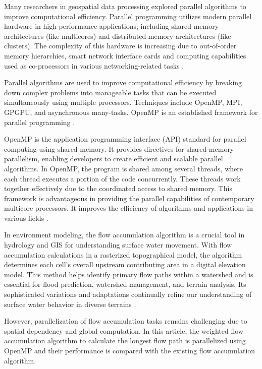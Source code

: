 \documentclass[journal, a4paper]{IEEEtran}
\begin{document}
	Many researchers in geospatial data processing explored parallel algorithms to improve computational efficiency. Parallel programming utilizes modern parallel hardware in high-performance applications, including shared-memory architectures (like multicores) and distributed-memory architectures (like clusters). The complexity of this hardware is increasing due to out-of-order memory hierarchies, smart network interface cards and computing capabilities used as co-processors in various networking-related tasks \cite{LOFF2021743}.
	
	Parallel algorithms are used to improve computational efficiency by breaking down complex problems into manageable tasks that can be executed simultaneously using multiple processors. Techniques include OpenMP, MPI, GPGPU, and asynchronous many-tasks. OpenMP is an established framework for parallel programming \cite{KOTYRA2023105728}.
	
	OpenMP is the application programming interface (API) standard for parallel computing using shared memory. It provides directives for shared-memory parallelism, enabling developers to create efficient and scalable parallel algorithms. In OpenMP, the program is shared among several threads, where each thread executes a portion of the code concurrently. These threads work together effectively due to the coordinated access to shared memory. This framework is advantageous in providing the parallel capabilities of contemporary multicore processors. It improves the efficiency of algorithms and applications in various fields \cite{chapman2007using}.
	
	In environment modeling, the flow accumulation algorithm is a crucial tool in hydrology and GIS for understanding surface water movement. With flow accumulation calculations in a rasterized topographical model, the algorithm determines each cell's overall upstream contributing area in a digital elevation model. This method helps identify primary flow paths within a watershed and is essential for flood prediction, watershed management, and terrain analysis. Its sophisticated variations and adaptations continually refine our understanding of surface water behavior in diverse terrains \cite{CHO2023105771,KOTYRA2023105728,Zhou2019}.
	
	However, parallelization of flow accumulation tasks remains challenging due to spatial dependency and global computation. In this article, the weighted flow accumulation algorithm to calculate the longest flow path is parallelized using OpenMP and their performance is compared with the existing flow accumulation algorithm.
	
\end{document}
